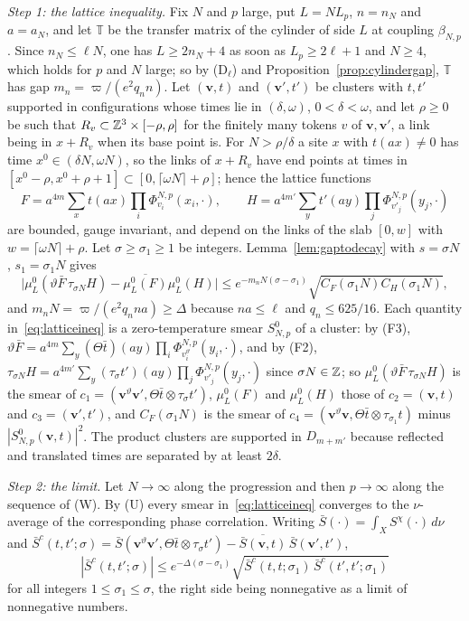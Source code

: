 \emph{Step 1: the lattice inequality.} Fix $N$ and $p$ large, put $L=NL_p$,
$n=n_N$ and $a=a_N$, and let $\mathbb T$ be the transfer matrix of the
cylinder of side $L$ at coupling $\beta_{N,p}$. Since $n_N\le\ell N$, one has
$L\ge2n_N+4$ as soon as $L_p\ge2\ell+1$ and $N\ge4$, which holds for $p$ and
$N$ large; so by (D$_\ell$) and Proposition~\ref{prop:cylindergap},
$\mathbb T$ has gap $m_n=\varpi/(e^2q_nn)$. Let $(\mathbf v,t)$ and
$(\mathbf v',t')$ be clusters with $t,t'$ supported in configurations whose
times lie in $(\delta,\omega)$, $0<\delta<\omega$, and let $\rho\ge0$ be such
that $R_v\subset\mathbb{Z}^3\times[-\rho,\rho]$ for the finitely many tokens $v$ of
$\mathbf v,\mathbf v'$, a link being in $x+R_v$ when its base point is. For
$N>\rho/\delta$ a site $x$ with $t(ax)\ne0$ has time $x^0\in(\delta N,\omega
N)$, so the links of $x+R_v$ have end points at times in $[x^0-\rho,x^0+\rho
+1]\subset[0,\lceil\omega N\rceil+\rho]$; hence the lattice functions
\[
F=a^{4m}\sum_xt(ax)\prod_i\Phi^{N,p}_{v_i}(x_i,\cdot),\qquad
H=a^{4m'}\sum_yt'(ay)\prod_j\Phi^{N,p}_{v'_j}(y_j,\cdot)
\]
are bounded, gauge invariant, and depend on the links of the slab
$[0,w]$ with $w=\lceil\omega N\rceil+\rho$. Let $\sigma\ge\sigma_1\ge1$ be integers.
Lemma~\ref{lem:gaptodecay} with $s=\sigma N$, $s_1=\sigma_1N$ gives
\begin{equation}\label{eq:latticeineq}
\bigl|\mu^0_L(\vartheta\bar F\,\tau_{\sigma N}H)-\overline{\mu^0_L(F)}\mu^0_L(H)\bigr|
\le e^{-m_nN(\sigma-\sigma_1)}\sqrt{C_F(\sigma_1N)C_H(\sigma_1N)},
\end{equation}
and $m_nN=\varpi/(e^2q_nna)\ge\Delta$ because $na\le\ell$ and $q_n\le625/16$.
Each quantity in~\eqref{eq:latticeineq} is a zero-temperature smear $S^0_{N,p}$
of a cluster: by (F3), $\vartheta\bar F=a^{4m}\sum_y(\Theta\bar t)(ay)\prod_i
\Phi^{N,p}_{v_i^\vartheta}(y_i,\cdot)$, and by (F2), $\tau_{\sigma N}H=a^{4m'}
\sum_y(\tau_\sigma t')(ay)\prod_j\Phi^{N,p}_{v'_j}(y_j,\cdot)$ since $\sigma N
\in\mathbb{Z}$; so $\mu^0_L(\vartheta\bar F\,\tau_{\sigma N}H)$ is the smear of
$c_1=(\mathbf v^\vartheta\mathbf v',\Theta\bar t\otimes\tau_\sigma t')$,
$\mu^0_L(F)$ and $\mu^0_L(H)$ those of $c_2=(\mathbf v,t)$ and $c_3=(\mathbf v',
t')$, and $C_F(\sigma_1N)$ is the smear of $c_4=(\mathbf v^\vartheta\mathbf v,
\Theta\bar t\otimes\tau_{\sigma_1}t)$ minus $|S^0_{N,p}(\mathbf v,t)|^2$. The product clusters are supported in
$D_{m+m'}$ because reflected and translated times are separated by at least
$2\delta$.

\emph{Step 2: the limit.} Let $N\to\infty$ along the progression and then
$p\to\infty$ along the sequence of (W). By (U) every smear
in~\eqref{eq:latticeineq} converges to the $\nu$-average of the corresponding
phase correlation. Writing $\bar S(\cdot)=\int_XS^\chi(\cdot)\,d\nu$ and
$\bar S^c(t,t';\sigma)=\bar S(\mathbf v^\vartheta\mathbf v',\Theta\bar t
\otimes\tau_\sigma t')-\overline{\bar S(\mathbf v,t)}\,\bar S(\mathbf v',t')$,
\begin{equation}\label{eq:limitineq}
|\bar S^c(t,t';\sigma)|\le e^{-\Delta(\sigma-\sigma_1)}\sqrt{\bar S^c(t,t;\sigma_1)
\,\bar S^c(t',t';\sigma_1)}
\end{equation}
for all integers $1\le\sigma_1\le\sigma$, the right side being nonnegative as a
limit of nonnegative numbers.

